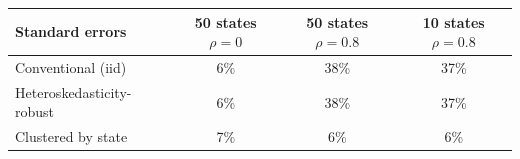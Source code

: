 \begin{tabular}{lccc}\toprule
Standard errors & \shortstack{50 states\\$\rho = 0$} & \shortstack{50 states\\$\rho = 0.8$} & \shortstack{10 states\\$\rho = 0.8$} \\ \midrule
Conventional (iid) & 6\% & 38\% & 37\% \\
Heteroskedasticity-robust & 6\% & 38\% & 37\% \\
Clustered by state & 7\% & 6\% & 6\% \\
\bottomrule\end{tabular}
